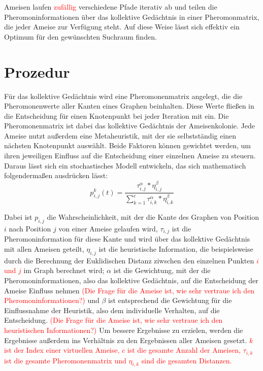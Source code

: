 Ameisen laufen \textcolor{red}{zufällig} verschiedene Pfade iterativ ab und 
teilen die Pheromoninformationen über das kollektive Gedächtnis in einer 
Pheromonmatrix, die jeder Ameise zur Verfügung steht. Auf diese Weise lässt 
sich effektiv ein Optimum für den gewünschten Suchraum finden.

\section{Prozedur}
\label{sec:prozedur}

Für das kollektive Gedächtnis wird eine Pheromonenmatrix angelegt, die die
Pheromonenwerte aller Kanten eines Graphen beinhalten. Diese Werte fließen
in die Entscheidung für einen Knotenpunkt bei jeder Iteration mit ein. Die
Pheromonenmatrix ist dabei das kollektive Gedächtnis der Ameisenkolonie.
Jede Ameise nutzt außerdem eine Metaheuristik, mit der sie selbstständig einen
nächsten Knotenpunkt auswählt. Beide Faktoren können gewichtet werden, um
ihren jeweiligen Einfluss auf die Entscheidung einer einzelnen Ameise zu
steuern.
Daraus lässt sich ein stochastisches Modell entwickeln, das sich mathematisch
folgendermaßen ausdrücken lässt:
\begin{equation}
    p_{i,j}^k(t) = \frac{\tau_{i,j}^\alpha * \eta_{i,j}^\beta}{
        \sum_{k=1}^c \tau_{i,k}^\alpha * \eta_{i,k}^\beta
    }
\end{equation}

Dabei ist $p_{i,j}$ die Wahrscheinlichkeit, mit der die Kante des Graphen
von Position $i$ nach Position $j$ von einer Ameise gelaufen wird,
$\tau_{i,j}$ ist die Pheromoninformation für diese Kante und wird über das
kollektive Gedächtnis mit allen Ameisen geteilt, $\eta_{i,j}$ ist die
heuristische Information, die beispielsweise durch die Berechnung der
Euklidischen Distanz ziwschen den einzelnen Punkten \textcolor{red}{$i$ und 
$j$} im Graph berechnet wird;
$\alpha$ ist die Gewichtung, mit der die Pheromoninformationen, also das
kollektive Gedächtnis, auf die Entscheidung der Ameise Einfluss nehmen 
\textcolor{red}{(Die Frage für die Ameise ist, wie sehr vertraue ich den 
Pheromoninformationen?)} und
$\beta$ ist entsprechend die Gewichtung für die Einflussnahme der Heuristik,
also dem individuelle Verhalten, auf die Entscheidung. \textcolor{red}{(Die 
Frage für die Ameise ist, wie sehr vertraue ich den heuristischen 
Informationen?)}
Um bessere Ergebnisse zu erzielen, werden die Ergebnisse außerdem ins
Verhältnis zu den Ergebnissen aller Ameisen gesetzt.
\textcolor{red}{$k$ ist der Index einer virtuellen Ameise, $c$ ist die 
gesamte Anzahl der Ameisen, $\tau_{i,k}$ ist die gesamte Pheromonenmatrix
und $\eta_{i,k}$ sind die gesamten Distanzen.}

